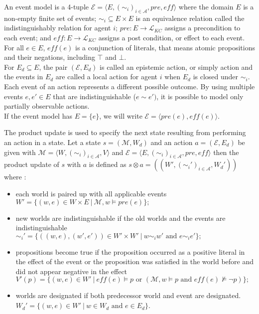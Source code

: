 An event model is a 4-tuple $\mathcal{E} = \langle E, (\sim_i)_{i\in \mathcal{A}}, pre, \textit{eff}  \rangle$ where the domain $E$ is a non-empty finite set of events; $\sim_i \subseteq E \times E$ is an equivalence relation called the indistinguishably relation for agent $i$;
$pre:E \rightarrow \mathcal{L}_{KC}$ assigns a precondition to each event;
and $\textit{eff}:E \rightarrow \mathcal{L}_{KC}$ assigns a post condition, or effect to each event.
For all $e\in E$, $\textit{eff}(e)$ is a conjunction of literals, that means atomic propositions and their negations, including $\top$ and $\bot$.\\
For $E_d \subseteq E$, the pair $(\mathcal{E}, E_d)$ is called an epistemic action, or simply action and the events in $E_d$ are called a local action for agent $i$ when $E_d$ is closed under $\sim_i$. \\
Each event of an action represents a different possible outcome.
By using multiple events $e, e' \in E$ that are indistinguishable ($e \sim e' )$, it is possible to model only partially observable actions.\\
If the event model has $E=\{e\}$, we will write $\mathcal{E}=\langle pre(e), \textit{eff}(e)\rangle$.

The product update is used to specify the next state resulting from performing an action in a state.
Let a state $s = (\mathcal{M},W_d)$ and an action $a=(\mathcal{E},E_d)$ be given with $\mathcal{M}=\langle W,(\sim_i)_{i \in \mathcal{A}}, V\rangle $ and $\mathcal{E}=\langle E, (\sim_i)_{i \in \mathcal{A}},pre, \textit{eff} \rangle$
then the product update of $s$ with $a$ is defined as $s \otimes a = ((W',(\sim_i')_{i \in \mathcal{A}}, W_d'))$ where :

 \begin{itemize}
   \item each world is paired up with all applicable events \\
   $W'=\{(w,e)\in W \times E ~|~ \mathcal{M}, w \models pre(e)\};$
   \item new worlds are indistinguishable if the old worlds and the events are indistinguishable \\
   $\sim_i'=\{((w,e),(w',e')) \in W'\times W' ~|~ w \sim_i w' \text{ and } e \sim_i e'\};$
   \item propositions become true if the proposition occurred as a positive literal in the effect of the event or the proposition was satisfied in the world before and did not appear negative in the effect \\
   $V'(p) = \{ (w,e) \in W' ~|~ \textit{eff}(e) \models p \text{ or } (\mathcal{M},w \models p \text{ and } \textit{eff}(e)\not \models \neg p)\};$
   \item worlds are designated if both predecessor world and event are designated. \\
   $W_d' = \{ (w,e) \in W' ~|~ w \in W_d \text{ and } e \in E_d\}$.
 \end{itemize}

